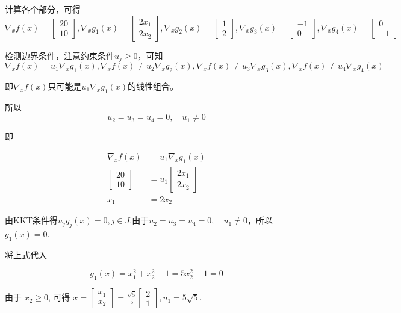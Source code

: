 计算各个部分，可得
$$ \nabla_{x} f(x)=\left[\begin{array}{c}20 \\ 10\end{array}\right], \nabla_{x} g_{1}(x)=\left[\begin{array}{c}2 x_{1} \\ 2 x_{2}\end{array}\right], \nabla_{x} g_{2}(x)=\left[\begin{array}{l}1 \\ 2\end{array}\right], \nabla_{x} g_{3}(x)=\left[\begin{array}{l}-1 \\ 0\end{array}\right], \nabla_{x} g_{4}(x)=\left[\begin{array}{l}0 \\ -1\end{array}\right]$$

检测边界条件，注意约束条件$u_{j} \geq 0$，可知
$$ \nabla_{x} f(x)=u_{1} \nabla_{x} g_{1}(x), \nabla_{x} f(x) \neq u_{2} \nabla_{x} g_{2}(x), \nabla_{x} f(x) \neq u_{3} \nabla_{x} g_{3}(x), \nabla_{x} f(x) \neq u_{4} \nabla_{x} g_{4}(x) $$

即$\nabla_{x} f(x)$只可能是$u_{1} \nabla_{x} g_{1}(x)$的线性组合。

所以
$$ u_{2}=u_{3}=u_{4}=0, \quad u_{1} \neq 0 $$

即

$$
\begin{aligned}
    \nabla_{x} f(x)&=u_{1} \nabla_{x} g_{1}(x)\\
\left[\begin{array}{c}
20 \\
10
\end{array}\right]&=u_{1}\left[\begin{array}{c}
2 x_{1} \\
2 x_{2}
\end{array}\right]\\
x_{1}&=2 x_{2} 
\end{aligned}
$$

由KKT条件得$ u_{j} g_{j}(x)=0, j \in J $.由于$ u_{2}=u_{3}=u_{4}=0, \quad u_{1} \neq 0 $，所以$g_1(x) = 0$.


将上式代入

$$g_{1}(x)=x_{1}^{2}+x_{2}^{2}-1=5 x_{2}^{2}-1=0$$


由于 $ x_{2} \geq 0 $, 可得 $x = \left[\begin{array}{l}x_{1} \\ x_{2}\end{array}\right]=\frac{\sqrt{5}}{5}\left[\begin{array}{l}2 \\ 1\end{array}\right], u_{1}=5 \sqrt{5} $.

